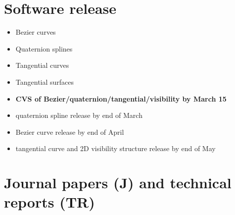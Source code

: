 \documentclass[12pt]{article}
\begin{document}
\section{Software release}

\begin{itemize}
\item Bezier curves
\item Quaternion splines
\item Tangential curves
\item Tangential surfaces
\end{itemize}

\begin{itemize}
\item {\bf CVS of Bezier/quaternion/tangential/visibility by March 15}
\item quaternion spline release by end of March
\item Bezier curve release by end of April
\item tangential curve and 2D visibility structure release by end of May
\end{itemize}

\clearpage

\section{Journal papers (J) and technical reports (TR)}
\end{document}

